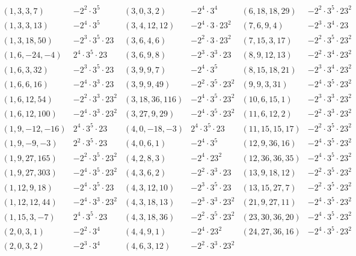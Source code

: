 $$\begin{array}{cc|cc|cc}
(1,3,3,7) & -2^2 \cdot 3^5 & (3, 0, 3, 2) & -2^4 \cdot 3^4 & (6, 18, 18, 29) & -2^2 \cdot 3^5 \cdot 23^2 \\
(1,3,3,13) & -2^4 \cdot 3^5 & (3, 4, 12, 12) & -2^4 \cdot 3 \cdot 23^2 & (7, 6, 9, 4) & -2^3 \cdot 3^4 \cdot 23 \\
(1, 3, 18, 50) & -2^3 \cdot 3^5 \cdot 23 & (3, 6, 4, 6) & -2^2 \cdot 3 \cdot 23^2  & (7, 15, 3, 17) & -2^2 \cdot 3^5 \cdot 23^2 \\
( 1, 6, -24, -4) & 2^4 \cdot 3^5 \cdot 23 & (3, 6, 9, 8) & -2^3 \cdot 3^3 \cdot 23 & (8, 9, 12, 13) & -2^2 \cdot 3^4 \cdot 23^2 \\
(1, 6, 3, 32) & -2^3 \cdot 3^5 \cdot 23 & (3, 9, 9, 7) & -2^4 \cdot 3^5 & (8, 15, 18, 21) & -2^3 \cdot 3^4 \cdot 23^2 \\
(1, 6, 6, 16) & -2^4 \cdot 3^3 \cdot 23 & (3, 9, 9, 49) & -2^2 \cdot 3^5 \cdot 23^2 & (9,9,3,31) & -2^4 \cdot 3^5 \cdot 23^2 \\
(1,6,12,54) & -2^2 \cdot 3^3 \cdot 23^2 & (3,18,36,116) & -2^4 \cdot 3^5 \cdot 23^2 & (10, 6, 15, 1) & -2^3 \cdot 3^3 \cdot 23^2 \\
(1,6,12,100) & -2^4 \cdot 3^3 \cdot 23^2 & (3,27,9,29) & -2^4 \cdot 3^5 \cdot 23^2 & (11, 6, 12, 2) & -2^2 \cdot 3^3 \cdot 23^2 \\
( 1, 9, -12, -16) & 2^4 \cdot 3^5 \cdot 23 & ( 4, 0, -18, -3) & 2^4 \cdot 3^5 \cdot 23 & (11, 15, 15, 17) & -2^2 \cdot 3^5 \cdot 23^2 \\
(1,9,-9,-3) & 2^2 \cdot 3^5 \cdot 23 & (4, 0, 6, 1) & -2^4 \cdot 3^5  & (12,9,36,16) & -2^4 \cdot 3^5 \cdot 23^2 \\
(1,9,27,165) & -2^2 \cdot 3^5 \cdot 23^2 & (4, 2, 8, 3) & -2^4  \cdot 23^2 & (12,36,36,35) & -2^4 \cdot 3^5 \cdot 23^2 \\
(1,9,27,303) & -2^4 \cdot 3^5 \cdot 23^2 & (4, 3, 6, 2) & -2^2 \cdot 3^3 \cdot 23 & (13, 9, 18, 12) & -2^2 \cdot 3^5 \cdot 23^2 \\
(1, 12, 9, 18) & -2^4 \cdot 3^5 \cdot 23 & (4, 3, 12, 10) & -2^3 \cdot 3^5 \cdot 23 & (13, 15, 27, 7) & -2^2 \cdot 3^5 \cdot 23^2 \\
(1,12,12,44) & -2^4 \cdot 3^3 \cdot 23^2 & (4, 3, 18, 13) & -2^3 \cdot 3^3 \cdot 23^2  & (21,9,27,11) & -2^4 \cdot 3^5 \cdot 23^2 \\
( 1, 15, 3, -7) & 2^4 \cdot 3^5 \cdot 23 & (4, 3, 18, 36) & -2^2 \cdot 3^5 \cdot 23^2 & (23,30,36,20) & -2^4 \cdot 3^5 \cdot 23^2  \\
(2, 0, 3, 1) & -2^2 \cdot 3^4 & (4, 4, 9, 1) & -2^4 \cdot 23^2 & (24,27,36,16) & -2^4 \cdot 3^5 \cdot 23^2 \\
(2, 0, 3, 2) & -2^3 \cdot 3^4 & (4, 6, 3, 12) & -2^2 \cdot 3^3 \cdot 23^2 & & \\
\end{array}
$$

